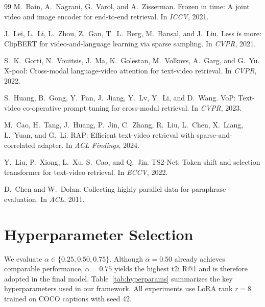 \documentclass[10pt,leqno]{amsart}
\begin{document}
\begin{thebibliography}{99}
M.~Bain, A.~Nagrani, G.~Varol, and A.~Zisserman.
\newblock Frozen in time: A joint video and image encoder for end-to-end retrieval.
\newblock In \textit{ICCV}, 2021.

J.~Lei, L.~Li, L.~Zhou, Z.~Gan, T.~L.~Berg, M.~Bansal, and J.~Liu.
\newblock Less is more: ClipBERT for video-and-language learning via sparse sampling.
\newblock In \textit{CVPR}, 2021.

S.~K.~Gorti, N.~Vouitsis, J.~Ma, K.~Golestan, M.~Volkovs, A.~Garg, and G.~Yu.
\newblock X-pool: Cross-modal language-video attention for text-video retrieval.
\newblock In \textit{CVPR}, 2022.

S.~Huang, B.~Gong, Y.~Pan, J.~Jiang, Y.~Lv, Y.~Li, and D.~Wang.
\newblock VoP: Text-video co-operative prompt tuning for cross-modal retrieval.
\newblock In \textit{CVPR}, 2023.

M.~Cao, H.~Tang, J.~Huang, P.~Jin, C.~Zhang, R.~Liu, L.~Chen, X.~Liang, L.~Yuan, and G.~Li.
\newblock RAP: Efficient text-video retrieval with sparse-and-correlated adapter.
\newblock In \textit{ACL Findings}, 2024.

Y.~Liu, P.~Xiong, L.~Xu, S.~Cao, and Q.~Jin.
\newblock TS2-Net: Token shift and selection transformer for text-video retrieval.
\newblock In \textit{ECCV}, 2022.

D.~Chen and W.~Dolan.
\newblock Collecting highly parallel data for paraphrase evaluation.
\newblock In \textit{ACL}, 2011.

\end{thebibliography}

\section{Hyperparameter Selection}

We evaluate $\alpha \in \{0.25, 0.50, 0.75\}$. Although $\alpha{=}0.50$ already achieves comparable performance, $\alpha{=}0.75$ yields the highest t2i R@1 and is therefore adopted in the final model. Table~\ref{tab:hyperparams} summarizes the key hyperparameters used in our framework. All experiments use LoRA rank $r=8$ trained on COCO captions with seed 42.
\end{document}
